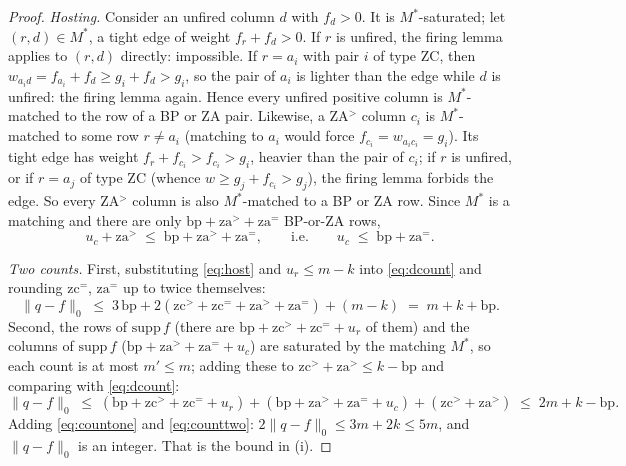\begin{proof}
\emph{Hosting.}  Consider an unfired column $d$ with $f_d>0$.  It is
$M^*$-saturated; let $(r,d) \in M^*$, a tight edge of weight $f_r + f_d > 0$.
If $r$ is unfired, the firing lemma applies to $(r,d)$ directly: impossible.
If $r=a_i$ with pair $i$ of type ZC, then $w_{a_i d} = f_{a_i} + f_d \ge g_i +
f_d > g_i$, so the pair of $a_i$ is lighter than the edge while $d$ is unfired:
the firing lemma again.  Hence every unfired positive column is
$M^*$-matched to the row of a BP or ZA pair.  Likewise, a ZA$^>$ column $c_i$
is $M^*$-matched to some row $r \neq a_i$ (matching to $a_i$ would force
$f_{c_i} = w_{a_i c_i} = g_i$).  Its tight edge has weight $f_r + f_{c_i} >
f_{c_i} > g_i$, heavier than the pair of $c_i$; if $r$ is unfired, or if
$r = a_j$ of type ZC (whence $w \ge g_j + f_{c_i} > g_j$), the firing
lemma forbids the edge.  So every ZA$^>$ column is also $M^*$-matched to
a BP or ZA row.  Since $M^*$ is a matching and there are only $\mathrm{bp} +
\mathrm{za}^> + \mathrm{za}^=$ BP-or-ZA rows,
\begin{equation}\label{eq:host}
  u_c + \mathrm{za}^> \;\le\; \mathrm{bp} + \mathrm{za}^> + \mathrm{za}^=,
  \qquad\text{i.e.}\qquad
  u_c \;\le\; \mathrm{bp} + \mathrm{za}^= .
\end{equation}

\emph{Two counts.}  First, substituting \eqref{eq:host} and $u_r\le m-k$ into
\eqref{eq:dcount} and rounding $\mathrm{zc}^=$, $\mathrm{za}^=$ up to twice
themselves:
\begin{equation}\label{eq:countone}
  \|q-f\|_0 \;\le\; 3\,\mathrm{bp} + 2(\mathrm{zc}^>+\mathrm{zc}^=+\mathrm{za}^>+\mathrm{za}^=) + (m-k)
           \;=\; m + k + \mathrm{bp} .
\end{equation}
Second, the rows of $\mathrm{supp}\, f$ (there are
$\mathrm{bp}+\mathrm{zc}^>+\mathrm{zc}^=+u_r$ of them) and the columns of
$\mathrm{supp}\, f$ ($\mathrm{bp}+\mathrm{za}^>+\mathrm{za}^=+u_c$) are
saturated by the matching $M^*$, so each count is at most $m' \le m$; adding
these to $\mathrm{zc}^>+\mathrm{za}^> \le k - \mathrm{bp}$ and comparing with
\eqref{eq:dcount}:
\begin{equation}\label{eq:counttwo}
  \|q-f\|_0 \;\le\; (\mathrm{bp}+\mathrm{zc}^>+\mathrm{zc}^=+u_r) +
  (\mathrm{bp}+\mathrm{za}^>+\mathrm{za}^=+u_c) + (\mathrm{zc}^>+\mathrm{za}^>)
           \;\le\; 2m + k - \mathrm{bp} .
\end{equation}
Adding \eqref{eq:countone} and \eqref{eq:counttwo}:
$2\|q-f\|_0 \le 3m + 2k \le 5m$, and $\|q-f\|_0$ is an integer. That is the bound in (i).


\end{proof}
